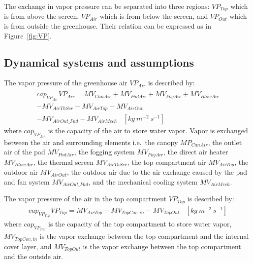 \documentclass[a4paper]{article}
\numberwithin{equation}{section}
\begin{document}
The exchange in vapor pressure can be separated into three regions: \(VP_{Top}\) which is from above the screen, \(VP_{Air}\) which is from below the screen, and \(VP_{Out}\) which is from outside the greenhouse.
Their relation can be expressed as in Figure~\ref{fig:VP}.

\subsection{Dynamical systems and assumptions}
The vapor pressure of the greenhouse air \(VP_{Air}\) is described by:
\begin{multline*}
  cap_{VP_{Air}}\dot{VP_{Air}} = MV_{CanAir} + MV_{PadAir} + MV_{FogAir} + MV_{BlowAir} \\
  - MV_{AirThScr} - MV_{AirTop} - MV_{AirOut} \\
  - MV_{AirOut\_Pad} - MV_{AirMech} ~~~~ [kg\ m^{-2}\ s^{-1}]
\end{multline*}
where \(cap_{VP_{Air}}\) is the capacity of the air to store water vapor.
Vapor is exchanged between the air and surrounding elements i.e.\ the canopy \(MP_{CanAir}\), the outlet air of the pad \(MV_{PadAir}\), the fogging system \(MV_{FogAir}\), the direct air heater \(MV_{BlowAir}\), the thermal screen \(MV_{AirThScr}\), the top compartment air \(MV_{AirTop}\), the outdoor air \(MV_{AirOut}\), the outdoor air due to the air exchange caused by the pad and fan system \(MV_{AirOut\_Pad}\), and the mechanical cooling system \(MV_{AirMech}\).

The vapor pressure of the air in the top compartment \(VP_{Top}\) is described by:
\begin{multline*}
  cap_{VP_{Top}}\dot{VP_{Top}} = MV_{AirTop} - MV_{TopCov,in} - MV_{TopOut} ~~~~ [kg\ m^{-2}\ s^{-1}]
\end{multline*}
where \(cap_{VP_{Top}}\) is the capacity of the top compartment to store water vapor, \(MV_{TopCov,in}\) is the vapor exchange between the top compartment and the internal cover layer, and \(MV_{TopOut}\) is the vapor exchange between the top compartment and the outside air.
\end{document}
